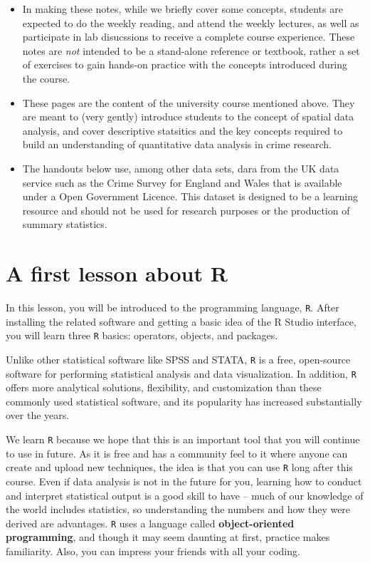 \documentclass[
]{book}
\providecommand{\tightlist}{%
  \setlength{\itemsep}{0pt}\setlength{\parskip}{0pt}}
\begin{document}
\begin{itemize}
\tightlist
\item
  In making these notes, while we briefly cover some concepts, students are expected to do the weekly reading, and attend the weekly lectures, as well as participate in lab disucssions to receive a complete course experience. These notes are \emph{not} intended to be a stand-alone reference or textbook, rather a set of exercises to gain hands-on practice with the concepts introduced during the course.
\item
  These pages are the content of the university course mentioned above. They are meant to (very gently) introduce students to the concept of spatial data analysis, and cover descriptive statsitics and the key concepts required to build an understanding of quantitative data analysis in crime research.
\item
  The handouts below use, among other data sets, dara from the UK data service such as the Crime Survey for England and Wales that is available under a Open Government Licence. This dataset is designed to be a learning resource and should not be used for research purposes or the production of summary statistics.
\end{itemize}

\hypertarget{a-first-lesson-about-r}{%
\chapter{A first lesson about R}\label{a-first-lesson-about-r}}

In this lesson, you will be introduced to the programming language, \texttt{R}. After installing the related software and getting a basic idea of the R Studio interface, you will learn three \texttt{R} basics: operators, objects, and packages.

Unlike other statistical software like SPSS and STATA, \texttt{R} is a free, open-source software for performing statistical analysis and data visualization. In addition, \texttt{R} offers more analytical solutions, flexibility, and customization than these commonly used statistical software, and its popularity has increased substantially over the years.

We learn \texttt{R} because we hope that this is an important tool that you will continue to use in future. As it is free and has a community feel to it where anyone can create and upload new techniques, the idea is that you can use \texttt{R} long after this course. Even if data analysis is not in the future for you, learning how to conduct and interpret statistical output is a good skill to have -- much of our knowledge of the world includes statistics, so understanding the numbers and how they were derived are advantages. \texttt{R} uses a language called \textbf{object-oriented programming}, and though it may seem daunting at first, practice makes familiarity. Also, you can impress your friends with all your coding.
\end{document}
